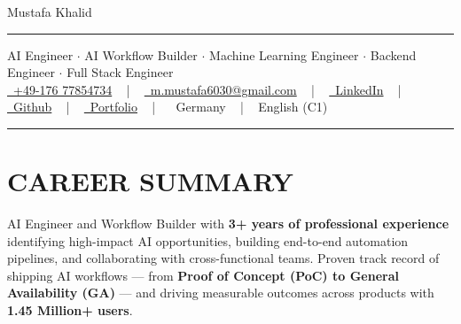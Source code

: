 \documentclass[letterpaper,10pt]{article}
\newcommand{\documentTitle}[2]{
  \begin{center}
    {\Huge\color{accentTitle} #1}
    \vspace{10pt}
    {\color{accentLine} \hrule}
    \vspace{2pt}
    \footnotesize{#2}
    \vspace{2pt}
    {\color{accentLine} \hrule}
  \end{center}
}
\begin{document}

  \documentTitle{Mustafa Khalid}{
  \vspace{0.1cm}
   AI Engineer $\cdot$ AI Workflow Builder $\cdot$ Machine Learning Engineer $\cdot$ Backend Engineer $\cdot$ Full Stack Engineer\\[4pt]
  \href{tel:+4917677854734}{
    \raisebox{-0.05\height}\faPhone\ +49-176 77854734} ~ | ~
  \href{mailto:m.mustafa6030@gmail.com}{
    \raisebox{-0.15\height}\faEnvelope\ m.mustafa6030@gmail.com} ~ | ~
  \href{https://www.linkedin.com/in/mustafa-khalid-23a8071a8/}{
    \raisebox{-0.15\height}\faLinkedin\ LinkedIn} ~ | ~
  \href{https://github.com/MustafaKm6030}{
    \raisebox{-0.15\height}\faGithub\ Github} ~ | ~
  \href{https://mustafakhalidmalik.vercel.app/}{
    \raisebox{-0.15\height}\faDesktop\ Portfolio} ~ | ~
  \raisebox{-0.15\height}\faHome\ Germany ~ | ~
  English (C1)
  }





\section{CAREER SUMMARY}

{ AI Engineer and Workflow Builder with \textbf{3+ years of professional experience} identifying high-impact AI opportunities, building end-to-end automation pipelines, and collaborating with cross-functional teams. Proven track record of shipping AI workflows — from \textbf{Proof of Concept (PoC) to General Availability (GA)} — and driving measurable outcomes across products with \textbf{1.45 Million+ users}.}


\end{document}
